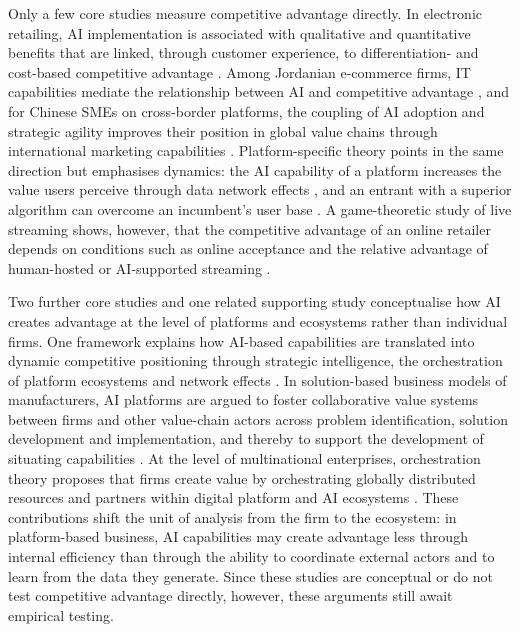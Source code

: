 Only a few core studies measure competitive advantage directly. In electronic retailing, AI implementation is associated with qualitative and quantitative benefits that are linked, through customer experience, to differentiation- and cost-based competitive advantage \parencite[1]{bunea2026}. Among Jordanian e-commerce firms, IT capabilities mediate the relationship between AI and competitive advantage \parencite[1]{slrR228}, and for Chinese SMEs on cross-border platforms, the coupling of AI adoption and strategic agility improves their position in global value chains through international marketing capabilities \parencite[1250]{slrR216}. Platform-specific theory points in the same direction but emphasises dynamics: the AI capability of a platform increases the value users perceive through data network effects \parencite[534]{gregory2021}, and an entrant with a superior algorithm can overcome an incumbent's user base \parencite[187]{chen2026}. A game-theoretic study of live streaming shows, however, that the competitive advantage of an online retailer depends on conditions such as online acceptance and the relative advantage of human-hosted or AI-supported streaming \parencite[1348]{slrR199}.

Two further core studies and one related supporting study conceptualise how AI creates advantage at the level of platforms and ecosystems rather than individual firms. One framework explains how AI-based capabilities are translated into dynamic competitive positioning through strategic intelligence, the orchestration of platform ecosystems and network effects \parencite[649]{slrR088}. In solution-based business models of manufacturers, AI platforms are argued to foster collaborative value systems between firms and other value-chain actors across problem identification, solution development and implementation, and thereby to support the development of situating capabilities \parencite[1]{slrR179}. At the level of multinational enterprises, orchestration theory proposes that firms create value by orchestrating globally distributed resources and partners within digital platform and AI ecosystems \parencite[689]{slrR213}. These contributions shift the unit of analysis from the firm to the ecosystem: in platform-based business, AI capabilities may create advantage less through internal efficiency than through the ability to coordinate external actors and to learn from the data they generate. Since these studies are conceptual or do not test competitive advantage directly, however, these arguments still await empirical testing.

